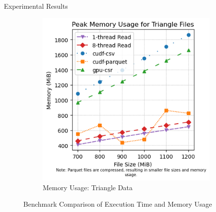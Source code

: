 \documentclass{beamer}
\begin{document}
\begin{frame}{Experimental Results}
\begin{figure}[h!]
\begin{subfigure}[b]{0.45\linewidth}
     \includegraphics[width=\linewidth]{memory_triangle.png}
     \caption{Memory Usage: Triangle Data}
     \label{fig:memory_triangle}
   \end{subfigure}
   
   \caption{Benchmark Comparison of Execution Time and Memory Usage}
   \label{fig:benchmark_comparison}
 \end{figure}
 
 \end{frame}



\end{document}

